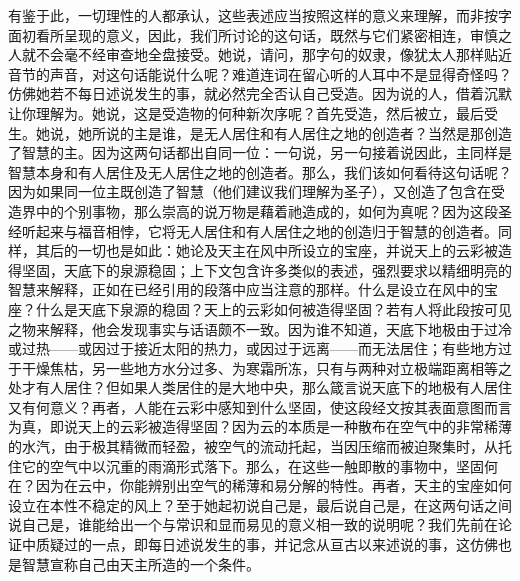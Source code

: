 有鉴于此，一切理性的人都承认，这些表述应当按照这样的意义来理解，而非按字面初看所呈现的意义，因此，我们所讨论的这句话，既然与它们紧密相连，审慎之人就不会毫不经审查地全盘接受。她说，请问，那字句的奴隶，像犹太人那样贴近音节的声音，对这句话能说什么呢？难道连词在留心听的人耳中不是显得奇怪吗？仿佛她若不每日述说发生的事，就必然完全否认自己受造。因为说的人，借着沉默让你理解为。她说，这是受造物的何种新次序呢？首先受造，然后被立，最后受生。她说，她所说的主是谁，是无人居住和有人居住之地的创造者？当然是那创造了智慧的主。因为这两句话都出自同一位：一句说，另一句接着说因此，主同样是智慧本身和有人居住及无人居住之地的创造者。那么，我们该如何看待这句话呢？因为如果同一位主既创造了智慧（他们建议我们理解为圣子），又创造了包含在受造界中的个别事物，那么崇高的说万物是藉着祂造成的，如何为真呢？因为这段圣经听起来与福音相悖，它将无人居住和有人居住之地的创造归于智慧的创造者。同样，其后的一切也是如此：她论及天主在风中所设立的宝座，并说天上的云彩被造得坚固，天底下的泉源稳固；上下文包含许多类似的表述，强烈要求以精细明亮的智慧来解释，正如在已经引用的段落中应当注意的那样。什么是设立在风中的宝座？什么是天底下泉源的稳固？天上的云彩如何被造得坚固？若有人将此段按可见之物来解释，他会发现事实与话语颇不一致。因为谁不知道，天底下地极由于过冷或过热——或因过于接近太阳的热力，或因过于远离——而无法居住；有些地方过于干燥焦枯，另一些地方水分过多、为寒霜所冻，只有与两种对立极端距离相等之处才有人居住？但如果人类居住的是大地中央，那么箴言说天底下的地极有人居住又有何意义？再者，人能在云彩中感知到什么坚固，使这段经文按其表面意图而言为真，即说天上的云彩被造得坚固？因为云的本质是一种散布在空气中的非常稀薄的水汽，由于极其精微而轻盈，被空气的流动托起，当因压缩而被迫聚集时，从托住它的空气中以沉重的雨滴形式落下。那么，在这些一触即散的事物中，坚固何在？因为在云中，你能辨别出空气的稀薄和易分解的特性。再者，天主的宝座如何设立在本性不稳定的风上？至于她起初说自己是，最后说自己是，在这两句话之间说自己是，谁能给出一个与常识和显而易见的意义相一致的说明呢？我们先前在论证中质疑过的一点，即每日述说发生的事，并记念从亘古以来述说的事，这仿佛也是智慧宣称自己由天主所造的一个条件。\par


